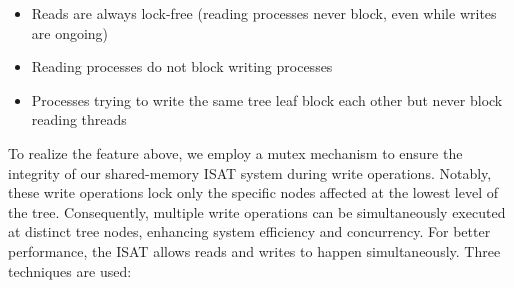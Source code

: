 \begin{itemize}
	\item Reads are always lock-free (reading processes never block, even while writes are ongoing)
	\item Reading processes do not block writing processes
	\item Processes trying to write the same tree leaf block each other but never block reading threads
\end{itemize}

To realize the feature above, we employ a mutex mechanism to ensure the integrity of our shared-memory ISAT system during write operations. Notably, these write operations lock only the specific nodes affected at the lowest level of the tree. Consequently, multiple write operations can be simultaneously executed at distinct tree nodes, enhancing system efficiency and concurrency.  For better performance, the ISAT allows reads and writes to happen simultaneously. Three techniques are used:

